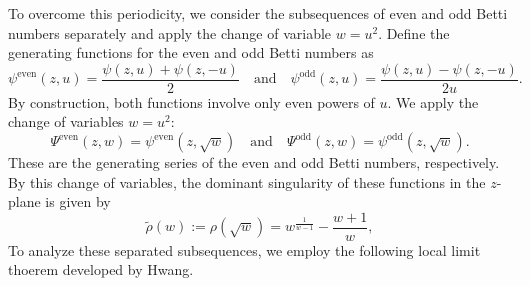 \documentclass[11pt,letterpaper]{amsart}
\numberwithin{equation}{section}
\newtheorem{theorem}{Theorem}[section]
\theoremstyle{definition}
\def\EE{\mathbb{E}}
\def\and{\quad{\rm and}\quad}
\def\and{\quad\text{and}\quad}
\begin{document}
To overcome this periodicity, we consider the subsequences of even and odd Betti numbers separately and apply the change of variable $w=u^2$. Define the generating functions for the even and odd Betti numbers as
\[ \psi^\mathrm{even}(z, u) = \frac{\psi(z, u)+ \psi(z, -u)}{2} \and \psi^\mathrm{odd}(z, u) = \frac{\psi(z, u)- \psi(z, -u)}{2u}. \]
By construction, both functions involve only even powers of $u$. We apply the change of variables $w=u^2$:
\[ \Psi^\mathrm{even}(z, w) = \psi^\mathrm{even}(z, \sqrt{w})  \and \Psi^\mathrm{odd}(z, w) =  \psi^\mathrm{odd}(z, \sqrt{w}) .  \]
These are the generating series of the even and odd Betti numbers, respectively. By this change of variables, the dominant singularity of these functions in the $z$-plane is given by \[\tilde{\rho}(w):=\rho(\sqrt{w}) = w^{\frac{1}{w-1}}- \frac{w+1}{w},\]
To analyze these separated subsequences, we employ the following local limit thoerem developed by Hwang.


\end{document}
